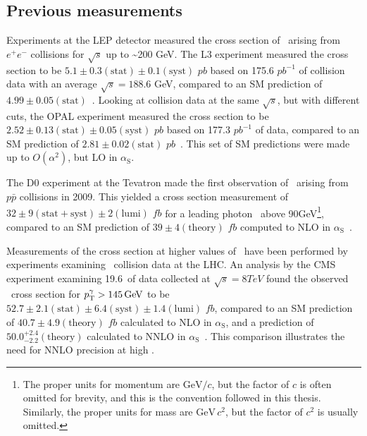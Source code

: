 \subsection{Previous measurements} \label{sec:introduction_znng_previous_measurements}
Experiments at the LEP detector measured the cross section of \zinvg\ arising from $e^{\mathrm{+}}e^{\mathrm{-}}$ collisions for $\sqrt{s}$ up to \textasciitilde200 GeV.
The L3 experiment measured the cross section to be $5.1 \pm 0.3\mathrm{(stat)} \pm 0.1\mathrm{(syst)}$ $pb$ based on 175.6 $pb^{-1}$ of collision data with an average $\sqrt{s} = 188.6$ GeV, compared to an SM
prediction of $4.99 \pm 0.05\mathrm{(stat)}$~\cite{ref:j.physletb.2004.07.002}. Looking at collision data at the same $\sqrt{s}$, but with different cuts,
the OPAL experiment measured the cross section to be $2.52 \pm 0.13\mathrm{(stat)} \pm 0.05\mathrm{(syst)}$ $pb$ based on 177.3 $pb^{-1}$ of data, compared to an SM
prediction of $2.81 \pm 0.02\mathrm{(stat)}$ $pb$~\cite{}. This set of SM predictions were made up to $O(\alpha^2)$, but LO in $\alpha_\mathrm{S}$.

The D0 experiment at the Tevatron made the first observation of \zinvg\ arising from $p\bar{p}$ collisions in 2009. This yielded a cross section measurement of
$32 \pm 9\mathrm{(stat+syst)} \pm 2\mathrm{(lumi)}$ $fb$ for a leading photon \pT\ above 90\unit{GeV}\footnote{The proper units for momentum are $\mathrm{GeV}/c$, but the
factor of $c$ is often omitted for brevity, and this is the convention followed in this thesis. Similarly, the proper units for mass are $\mathrm{GeV}\,c^{2}$, but the factor
of $c^{2}$ is usually omitted.},
compared to an SM prediction of $39 \pm 4\mathrm{(theory)}$ $fb$ computed to NLO in $\alpha_\mathrm{S}$~\cite{ref:PhysRevLett.102.201802}.

Measurements of the cross section at higher values of \pTgamma\ have been performed by experiments examining \Pp\Pp\ collision data at the LHC.
An analysis by the CMS experiment examining 19.6\fbinv\ of data collected at $\sqrt{s} = 8\unit{TeV}$ found the observed \zinvg\ cross section for $\pTgamma > 145\unit{GeV}$ to be
$52.7 \pm 2.1\mathrm{(stat)} \pm 6.4\mathrm{(syst)} \pm 1.4\mathrm{(lumi)}$ $fb$, compared to an SM prediction of $40.7 \pm 4.9\mathrm{(theory)}$ $fb$ calculated to NLO in $\alpha_\mathrm{S}$, and
a prediction of $50.0^{+2.4}_{-2.2}\mathrm{(theory)}$ calculated to NNLO in $\alpha_\mathrm{S}$~\cite{ref:j.physletb.2016.06.080}. This comparison illustrates the need for NNLO precision at high \pTgamma.

